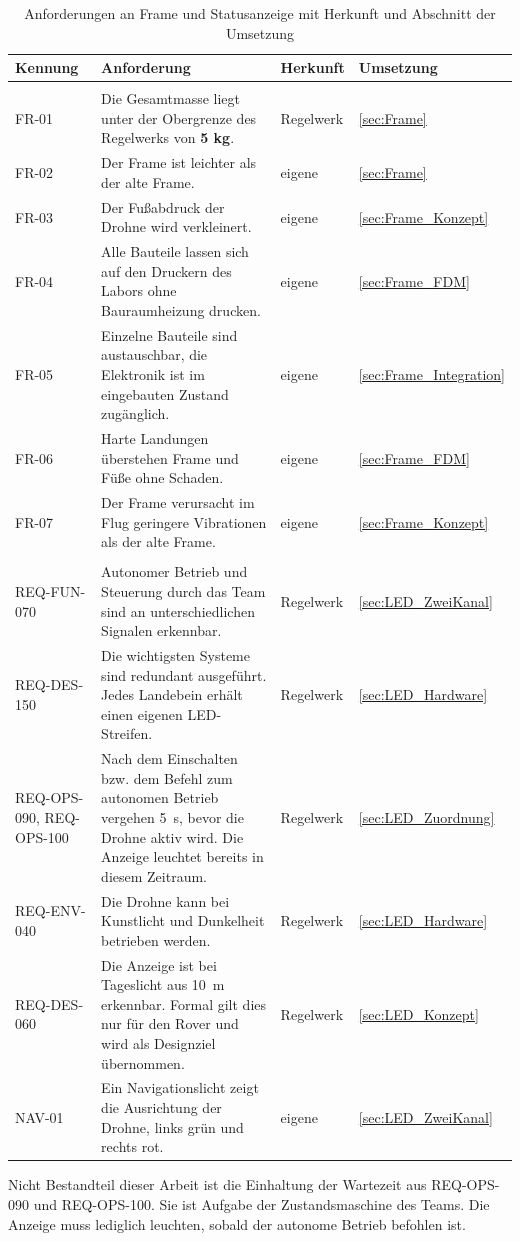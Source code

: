 \begin{table}[htbp]
    \centering
    \caption{Anforderungen an Frame und Statusanzeige mit Herkunft und Abschnitt der Umsetzung}
    \label{tab:ERC_Anforderungen}
    \small
    \begin{tabularx}{\textwidth}{>{\raggedright\arraybackslash}p{2.3cm} X >{\raggedright\arraybackslash}p{2.0cm} l}
        \toprule
        \textbf{Kennung} & \textbf{Anforderung} & \textbf{Herkunft} & \textbf{Umsetzung} \\
        \midrule
        \multicolumn{4}{l}{\textit{Frame}} \\
        FR-01 & Die Gesamtmasse liegt unter der Obergrenze des Regelwerks von \textbf{5 kg}. & Regelwerk & \ref{sec:Frame} \\
        FR-02 & Der Frame ist leichter als der alte Frame. & eigene & \ref{sec:Frame} \\
        FR-03 & Der Fußabdruck der Drohne wird verkleinert. & eigene & \ref{sec:Frame_Konzept} \\
        FR-04 & Alle Bauteile lassen sich auf den Druckern des Labors ohne Bauraumheizung drucken. & eigene & \ref{sec:Frame_FDM} \\
        FR-05 & Einzelne Bauteile sind austauschbar, die Elektronik ist im eingebauten Zustand zugänglich. & eigene & \ref{sec:Frame_Integration} \\
        FR-06 & Harte Landungen überstehen Frame und Füße ohne Schaden. & eigene & \ref{sec:Frame_FDM} \\
        FR-07 & Der Frame verursacht im Flug geringere Vibrationen als der alte Frame. & eigene & \ref{sec:Frame_Konzept} \\
        \midrule
        \multicolumn{4}{l}{\textit{Statusanzeige}} \\
        REQ-FUN-070 & Autonomer Betrieb und Steuerung durch das Team sind an unterschiedlichen Signalen erkennbar. & Regelwerk & \ref{sec:LED_ZweiKanal} \\
        REQ-DES-150 & Die wichtigsten Systeme sind redundant ausgeführt. Jedes Landebein erhält einen eigenen LED-Streifen. & Regelwerk & \ref{sec:LED_Hardware} \\
        REQ-OPS-090, REQ-OPS-100 & Nach dem Einschalten bzw. dem Befehl zum autonomen Betrieb vergehen \SI{5}{\second}, bevor die Drohne aktiv wird. Die Anzeige leuchtet bereits in diesem Zeitraum. & Regelwerk & \ref{sec:LED_Zuordnung} \\
        REQ-ENV-040 & Die Drohne kann bei Kunstlicht und Dunkelheit betrieben werden. & Regelwerk & \ref{sec:LED_Hardware} \\
        REQ-DES-060 & Die Anzeige ist bei Tageslicht aus \SI{10}{\metre} erkennbar. Formal gilt dies nur für den Rover und wird als Designziel übernommen. & Regelwerk & \ref{sec:LED_Konzept} \\
        NAV-01 & Ein Navigationslicht zeigt die Ausrichtung der Drohne, links grün und rechts rot. & eigene & \ref{sec:LED_ZweiKanal} \\
        \bottomrule
    \end{tabularx}
\end{table}

Nicht Bestandteil dieser Arbeit ist die Einhaltung der Wartezeit aus REQ-OPS-090 und REQ-OPS-100. Sie ist Aufgabe der Zustandsmaschine des Teams. Die Anzeige muss lediglich leuchten, sobald der autonome Betrieb befohlen ist.
